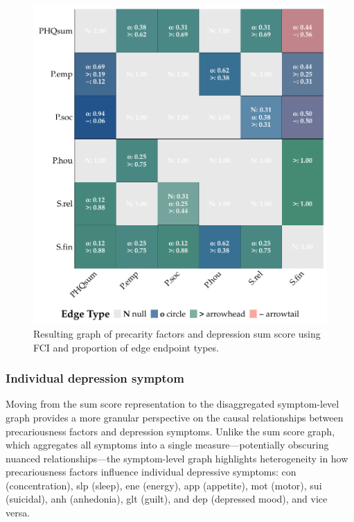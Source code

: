 \documentclass[
]{article}
\begin{document}
\begin{figure}
\begin{minipage}{0.50\linewidth}
{\includegraphics[width=1\textwidth,height=\textheight]{img/depsum_mat_fci.pdf}

}


\end{minipage}%

\caption{\label{fig-sum}Resulting graph of precarity factors and
depression sum score using FCI and proportion of edge endpoint types.}

\end{figure}%

\subsubsection{Individual depression
symptom}\label{individual-depression-symptom}

Moving from the sum score representation to the disaggregated
symptom-level graph provides a more granular perspective on the causal
relationships between precariousness factors and depression symptoms.
Unlike the sum score graph, which aggregates all symptoms into a single
measure---potentially obscuring nuanced relationships---the
symptom-level graph highlights heterogeneity in how precariousness
factors influence individual depressive symptoms: con (concentration),
slp (sleep), ene (energy), app (appetite), mot (motor), sui (suicidal),
anh (anhedonia), glt (guilt), and dep (depressed mood), and vice versa.
\end{document}
